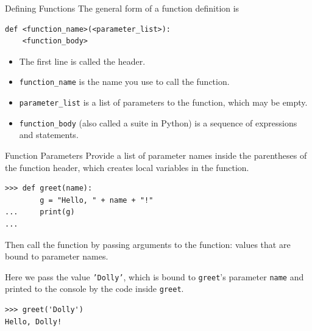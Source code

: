\documentclass[smaller, aspectratio=1610]{beamer}
\begin{document}
\begin{frame}[label={sec:orga8b9f77},fragile]{Defining Functions}
 The general form of a function definition is

\lstset{language=Python,label= ,caption= ,captionpos=b,numbers=none}
\begin{lstlisting}
def <function_name>(<parameter_list>):
    <function_body>
\end{lstlisting}

\begin{itemize}
\item The first line is called the header.
\item \texttt{function\_name} is the name you use to call the function.
\item \texttt{parameter\_list} is a list of parameters to the function, which may be empty.
\item \texttt{function\_body} (also called a suite in Python) is a sequence of expressions and statements.
\end{itemize}
\end{frame}

\begin{frame}[label={sec:orgc3e5857},fragile]{Function Parameters}
 Provide a list of parameter names inside the parentheses of the function header, which creates local variables in the function.

\lstset{language=Python,label= ,caption= ,captionpos=b,numbers=none}
\begin{lstlisting}
>>> def greet(name):
        g = "Hello, " + name + "!"
...     print(g)
...
\end{lstlisting}

Then call the function by passing \alert{arguments} to the function: values that are bound to parameter names.

Here we pass the value \texttt{'Dolly'}, which is bound to \texttt{greet}'s parameter \texttt{name} and printed to the console by the code inside \texttt{greet}.

\lstset{language=Python,label= ,caption= ,captionpos=b,numbers=none}
\begin{lstlisting}
>>> greet('Dolly')
Hello, Dolly!
\end{lstlisting}
\end{frame}
\end{document}
